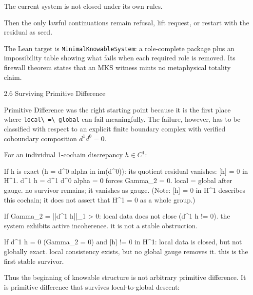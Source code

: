 \documentclass[
  10pt,
]{article}
\newenvironment{Shaded}{}{}
\newcommand{\NormalTok}[1]{#1}
\DeclareRobustCommand{\texttt}[1]{{\paperSymbolFont\nolinkurl{#1}}}
\begin{document}
\begin{Shaded}
\begin{Highlighting}[]
\NormalTok{The current system is not closed under its own rules.}
\end{Highlighting}
\end{Shaded}

Then the only lawful continuations remain refusal, lift request, or restart with the residual as seed.

The Lean target is \texttt{MinimalKnowableSystem}: a role-complete package plus an impossibility table showing what fails when each required role is removed. Its firewall theorem states that an MKS witness mints no metaphysical totality claim.

2.6 Surviving Primitive Difference

Primitive Difference was the right starting point because it is the first place where \texttt{local\ =\ global} can fail meaningfully. The failure, however, has to be classified with respect to an explicit finite boundary complex with verified coboundary composition \protect\hypertarget{math-E0002-0002}{}{\(d^1 d^0 = 0\)}.

For an individual 1-cochain discrepancy \protect\hypertarget{math-E0003-0003}{}{\(h \in C^1\)}:

\begin{Shaded}
\begin{Highlighting}[]
\NormalTok{If h is exact (h = d\^{}0 alpha in im(d\^{}0)):}
\NormalTok{  its quotient residual vanishes: [h] = 0 in H\^{}1.}
\NormalTok{  d\^{}1 h = d\^{}1 d\^{}0 alpha = 0 forces Gamma\_2 = 0.}
\NormalTok{  local = global after gauge.}
\NormalTok{  no survivor remains; it vanishes as gauge.}
\NormalTok{  (Note: [h] = 0 in H\^{}1 describes this cochain; it does not assert that H\^{}1 = 0 as a whole group.)}

\NormalTok{If Gamma\_2 = ||d\^{}1 h||\_1 \textgreater{} 0:}
\NormalTok{  local data does not close (d\^{}1 h != 0).}
\NormalTok{  the system exhibits active incoherence.}
\NormalTok{  it is not a stable obstruction.}

\NormalTok{If d\^{}1 h = 0 (Gamma\_2 = 0) and [h] != 0 in H\^{}1:}
\NormalTok{  local data is closed, but not globally exact.}
\NormalTok{  local consistency exists, but no global gauge removes it.}
\NormalTok{  this is the first stable survivor.}
\end{Highlighting}
\end{Shaded}

Thus the beginning of knowable structure is not arbitrary primitive difference. It is primitive difference that survives local-to-global descent:
\end{document}
